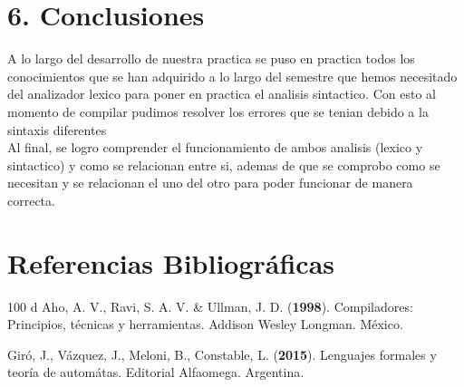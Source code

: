 \documentclass{article}
\begin{document}
\section{6. Conclusiones}
   A lo largo del desarrollo de nuestra practica se puso en practica todos los conocimientos que se han adquirido a lo largo del semestre que hemos necesitado del analizador lexico para poner en practica el analisis sintactico. Con esto al momento de compilar pudimos resolver los errores que se tenian debido a la sintaxis diferentes \\
   Al final, se logro comprender el funcionamiento de ambos analisis (lexico y sintactico) y como se relacionan entre si, ademas de que se comprobo como se necesitan y se relacionan el uno del otro para poder funcionar de manera correcta.
   
    \newpage
    
\section{Referencias Bibliográficas}
    \begin{thebibliography}{100}
        d
Aho, A. V., Ravi, S. A. V. \& Ullman, J. D. ({\bf 1998}). Compiladores: Principios, técnicas y herramientas. Addison Wesley Longman. México. 

Giró, J., Vázquez, J., Meloni, B., Constable, L. ({\bf 2015}). Lenguajes formales y teoría 
de automátas. Editorial Alfaomega. Argentina.

    \end{thebibliography}

 
        
\end{document}
